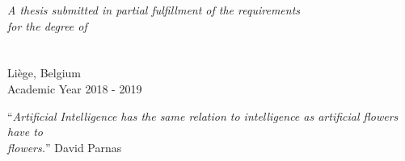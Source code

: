 \documentclass[
11pt, %
english, %
singlespacing, %
headsepline, %
]{master-thesis} %
\begin{document}
\begin{titlepage}
\begin{center}
\large \textit{A thesis submitted in partial fulfillment of the requirements\\ for the degree of \degreename}\\[1cm] %
\deptname\\
\facname\\
Liège, Belgium\\[4cm] 
 

{\large Academic Year 2018 - 2019}
 
\vfill
\end{center}
\end{titlepage}


\vspace*{0.2\textheight}

\noindent\enquote{\itshape Artificial Intelligence has the same relation to intelligence as artificial flowers have to\\ flowers.}\bigbreak
\hfill David Parnas

\end{document}
